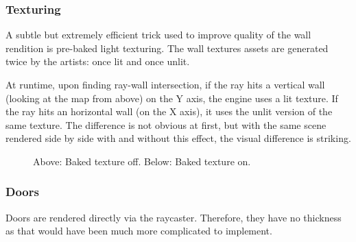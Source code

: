 \subsubsection{Texturing}
A subtle but extremely efficient trick used to improve quality of the wall rendition is pre-baked light texturing. The wall textures assets are generated twice by the artists: once lit and once unlit.\\
\par
At runtime, upon finding ray-wall intersection, if the ray hits a vertical wall (looking at the map from above) on the Y axis, the engine uses a lit texture. If the ray hits an horizontal wall (on the X axis), it uses the unlit version of the same texture. The difference is not obvious at first, but with the same scene rendered side by side with and without this effect, the visual difference is striking.\\
\par
  \begin{figure}[H]
\centering
 \end{figure}
\par
\par

\begin{minipage}{\textwidth}
\begin{figure}[H]
\centering
 \caption{Above: Baked texture off. Below: Baked texture on.}
 \end{figure}

\begin{figure}[H]
\centering
 
 \end{figure}
 \end{minipage}

 





\subsubsection{Doors}
Doors are rendered directly via the raycaster. Therefore, they have no thickness as that would have been much more complicated to implement.\\
\par
\begin{figure}[H]
 \centering
\end{figure}

